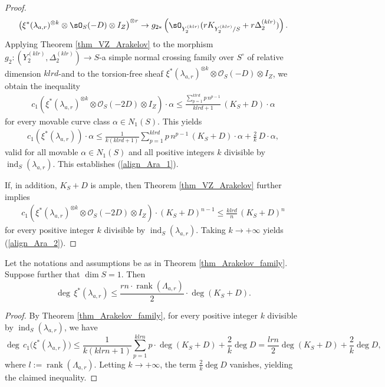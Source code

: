 \documentclass[11pt,letterpaper]{amsart}
\numberwithin{equation}{section}
\begin{document}
\begin{proof}
		\begin{align*}
			\left(\xi^\ast(\lambda_{a,r})^{\otimes k}\otimes\sO_S(-D)\otimes I_Z\right)^{\otimes r}\to g_{2\ast}\left(\sO_{Y_2^{(klr)}}(rK_{Y_2^{(klr)}/S}+r\Delta_2^{(klr)})\right).
		\end{align*}
		Applying Theorem \ref{thm_VZ_Arakelov} to the morphism $g_2 \colon (Y_2^{(klr)}, \Delta_2^{(klr)}) \to S$-a simple normal crossing family over $S^\circ$ of relative dimension $klrd$-and to the torsion-free sheaf $\xi^\ast(\lambda_{a,r})^{\otimes k} \otimes \mathcal{O}_S(-D) \otimes I_Z$, we obtain the inequality  
		\begin{align*}  
			c_1\!\left(\xi^\ast(\lambda_{a,r})^{\otimes k} \otimes \mathcal{O}_S(-2D) \otimes I_Z\right) \cdot \alpha \leq \frac{\sum_{p=1}^{klrd} p\,n^{p-1}}{klrd + 1}\, (K_S + D) \cdot \alpha  
		\end{align*}  
		for every movable curve class $\alpha \in N_1(S)$. This yields  
		\begin{align*}  
			c_1\!\left(\xi^\ast(\lambda_{a,r})\right) \cdot \alpha \leq \frac{1}{k(klrd + 1)} \sum_{p=1}^{klrd} p\,n^{p-1}\, (K_S + D) \cdot \alpha + \frac{2}{k}\, D \cdot \alpha,  
		\end{align*}  
		valid for all movable $\alpha \in N_1(S)$ and all positive integers $k$ divisible by $\operatorname{ind}_S(\lambda_{a,r})$. This establishes (\ref{align_Ara_1}).  
		
		If, in addition, $K_S + D$ is ample, then Theorem \ref{thm_VZ_Arakelov} further implies  
		\begin{align*}  
			c_1\!\left(\xi^\ast(\lambda_{a,r})^{\otimes k} \otimes \mathcal{O}_S(-2D) \otimes I_Z\right) \cdot (K_S + D)^{n-1} \leq \frac{klrd}{n}\, (K_S + D)^n  
		\end{align*}  
		for every positive integer $k$ divisible by $\operatorname{ind}_S(\lambda_{a,r})$. Taking $k\to+\infty$ yields (\ref{align_Ara_2}).
	\end{proof}
\begin{cor}\label{cor_Arakelov_dim1}
	Let the notations and assumptions be as in Theorem \ref{thm_Arakelov_family}. Suppose further that $\dim S = 1$. Then  
	\begin{equation*}
		\deg\, \xi^\ast(\lambda_{a,r}) \leq \frac{r n \cdot \operatorname{rank}(\Lambda_{a,r})}{2} \cdot \deg(K_S + D).
	\end{equation*}
\end{cor}
\begin{proof}
	By Theorem \ref{thm_Arakelov_family}, for every positive integer $k$ divisible by $\operatorname{ind}_S(\lambda_{a,r})$, we have  
	\begin{equation*}
		\deg\, c_1\big(\xi^\ast(\lambda_{a,r})\big) 
		\leq \frac{1}{k(k l r n + 1)} \sum_{p=1}^{k l r n} p \cdot \deg(K_S + D) + \frac{2}{k} \deg D
		= \frac{l r n}{2} \deg(K_S + D) + \frac{2}{k} \deg D,
	\end{equation*}
	where $l := \operatorname{rank}(\Lambda_{a,r})$. Letting $k \to +\infty$, the term $\frac{2}{k}\deg D$ vanishes, yielding the claimed inequality.
\end{proof}
\end{document}
